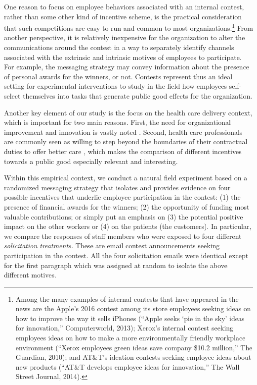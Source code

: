 \documentclass[11pt, titlepage]{article}
\begin{document}
One reason to focus on employee behaviors associated with an internal
contest, rather than some other kind of incentive scheme, is the
practical consideration that such competitions are easy to run and
common to most organizations.\footnote{Among the many examples of
  internal contests that have appeared in the news are the Apple's 2016
  contest among its store employees seeking ideas on how to improve the
  way it sells iPhones (``Apple seeks `pie in the sky' ideas for
  innovation,'' Computerworld, 2013); Xerox's internal contest seeking
  employees ideas on how to make a more environmentally friendly
  workplace environment (``Xerox employees green ideas save company
  \$10.2 million,'' The Guardian, 2010); and AT\&T's ideation contests
  seeking employee ideas about new products (``AT\&T develops employee
  ideas for innovation,'' The Wall Street Journal, 2014).} From another
perspective, it is relatively inexpensive for the organization to alter
the communications around the contest in a way to separately identify
channels associated with the extrinsic and intrinsic motives of
employees to participate. For example, the messaging strategy may convey
information about the presence of personal awards for the winners, or
not. Contests represent thus an ideal setting for experimental
interventions to study in the field how employees self-select themselves
into tasks that generate public good effects for the organization.

Another key element of our study is the focus on the health care
delivery context, which is important for two main reasons. First, the
need for organizational improvement and innovation is vastly noted
\citep{cutler2012reducing}. Second, health care professionals are
commonly seen as willing to step beyond the boundaries of their
contractual duties to offer better care \citep{delfgaauw2005dedicated},
which makes the comparison of different incentives towards a public good
especially relevant and interesting.

Within this empirical context, we conduct a natural field experiment
based on a randomized messaging strategy that isolates and provides
evidence on four possible incentives that underlie employee
participation in the contest: (1) the presence of financial awards for
the winners; (2) the opportunity of funding most valuable contributions;
or simply put an emphasis on (3) the potential positive impact on the
other workers or (4) on the patients (the customers). In particular, we
compare the responses of staff members who were exposed to four
different \emph{solicitation treatments.} These are email contest
announcements seeking participation in the contest. All the four
solicitation emails were identical except for the first paragraph which
was assigned at random to isolate the above different motives.
\end{document}
